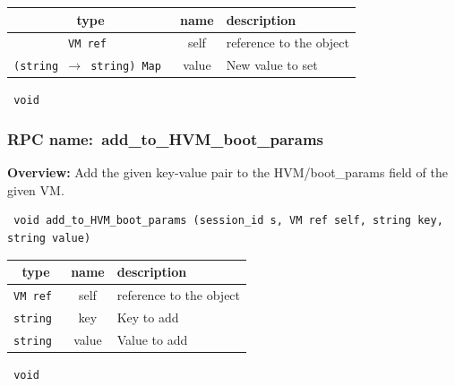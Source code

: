  
\vspace{0.3cm}
\begin{tabular}{|c|c|p{7cm}|}
 \hline
{\bf type} & {\bf name} & {\bf description} \\ \hline
{\tt VM ref } & self & reference to the object \\ \hline 

{\tt (string $\rightarrow$ string) Map } & value & New value to set \\ \hline 

\end{tabular}

\vspace{0.3cm}

{\tt 
void
}



\vspace{0.3cm}
\vspace{0.3cm}
\vspace{0.3cm}
\subsubsection{RPC name:~add\_to\_HVM\_boot\_params}

{\bf Overview:} 
Add the given key-value pair to the HVM/boot\_params field of the given VM.

\begin{verbatim} void add_to_HVM_boot_params (session_id s, VM ref self, string key, string value)\end{verbatim}



 
\vspace{0.3cm}
\begin{tabular}{|c|c|p{7cm}|}
 \hline
{\bf type} & {\bf name} & {\bf description} \\ \hline
{\tt VM ref } & self & reference to the object \\ \hline 

{\tt string } & key & Key to add \\ \hline 

{\tt string } & value & Value to add \\ \hline 

\end{tabular}

\vspace{0.3cm}

{\tt 
void
}



